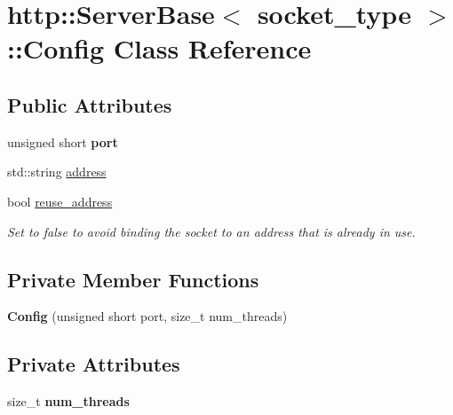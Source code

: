 \hypertarget{classhttp_1_1_server_base_1_1_config}{}\section{http\+:\+:Server\+Base$<$ socket\+\_\+type $>$\+:\+:Config Class Reference}
\label{classhttp_1_1_server_base_1_1_config}
\subsection*{Public Attributes}
\begin{DoxyCompactItemize}
\item 
\mbox{\label{classhttp_1_1_server_base_1_1_config_a2b12945e4b5c9e901e062fda16b1be9c}} 
unsigned short {\bfseries port}
\item 
std\+::string \hyperlink{classhttp_1_1_server_base_1_1_config_ad0398c9e6bb43163dd91f0bc84854be9}{address}
\item 
\mbox{\label{classhttp_1_1_server_base_1_1_config_a7919149e31565fb764794c55a39fd068}} 
bool \hyperlink{classhttp_1_1_server_base_1_1_config_a7919149e31565fb764794c55a39fd068}{reuse\+\_\+address}
\begin{DoxyCompactList}\small\item\em Set to false to avoid binding the socket to an address that is already in use. \end{DoxyCompactList}\end{DoxyCompactItemize}
\subsection*{Private Member Functions}
\begin{DoxyCompactItemize}
\item 
\mbox{\label{classhttp_1_1_server_base_1_1_config_a313f78f171cc298820ccf40e58ceab34}} 
{\bfseries Config} (unsigned short port, size\+\_\+t num\+\_\+threads)
\end{DoxyCompactItemize}
\subsection*{Private Attributes}
\begin{DoxyCompactItemize}
\item 
\mbox{\label{classhttp_1_1_server_base_1_1_config_a432f55ee3820cebe42afaab349144408}} 
size\+\_\+t {\bfseries num\+\_\+threads}
\end{DoxyCompactItemize}
